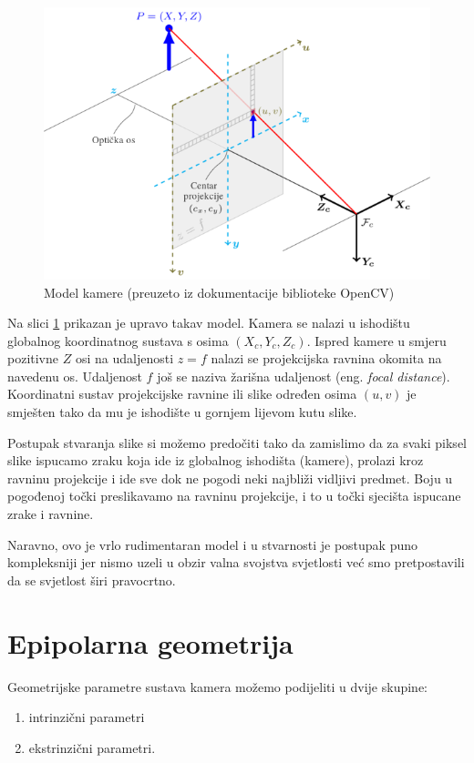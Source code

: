 \documentclass[utf8, zavrsni, numeric]{fer}
\begin{document}
\begin{figure}[htb]
  \centering
  \includegraphics[width=13cm]{img/pinhole_camera_model.png}
  \caption{Model kamere (preuzeto iz dokumentacije biblioteke OpenCV)}
  \label{fig:model-kamere}
\end{figure}

Na slici \ref{fig:model-kamere} prikazan je upravo takav model. Kamera se nalazi u ishodištu
globalnog koordinatnog sustava s osima $(X_c, Y_c, Z_c)$. Ispred kamere u smjeru pozitivne
$Z$ osi na udaljenosti $z = f$ nalazi se projekcijska ravnina okomita na navedenu os. Udaljenost $f$ još se naziva žarišna udaljenost (eng. {\sl focal distance}). Koordinatni sustav projekcijske ravnine
ili slike određen osima $(u, v)$ je smješten tako da mu je ishodište u gornjem lijevom kutu slike.

Postupak stvaranja slike si možemo predočiti tako da zamislimo da za svaki piksel slike ispucamo
zraku koja ide iz globalnog ishodišta (kamere), prolazi kroz ravninu projekcije i ide sve dok ne pogodi neki najbliži vidljivi predmet. Boju u pogođenoj točki preslikavamo na ravninu projekcije, i to u točki sjecišta ispucane zrake i ravnine.

Naravno, ovo je vrlo rudimentaran model i u stvarnosti je postupak puno kompleksniji jer nismo
uzeli u obzir valna svojstva svjetlosti već smo pretpostavili da se svjetlost širi pravocrtno.

\section{Epipolarna geometrija}

Geometrijske parametre sustava kamera možemo podijeliti u dvije skupine:
\begin{enumerate}
  \item intrinzični parametri
  \item ekstrinzični parametri.
\end{enumerate}
\end{document}

